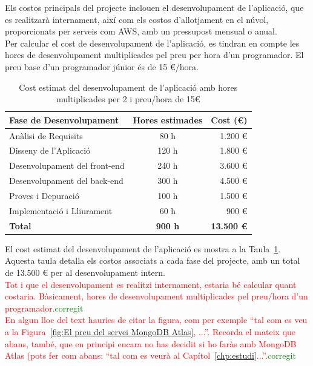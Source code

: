 \documentclass[a4paper,12pt,twoside]{ThesisStyle}
\newcommand{\pau}[1]{\textcolor{red}{#1}}
\newcommand{\sudan}[1]{\textcolor{green}{#1}}
\begin{document}
Els costos principals del projecte inclouen el desenvolupament de l'aplicació, que es realitzarà internament, així com els costos d'allotjament en el núvol, proporcionats per serveis com AWS, amb un pressupost mensual o anual.\\

Per calcular el cost de desenvolupament de l’aplicació, es tindran en compte les hores de desenvolupament multiplicades pel preu per hora d'un programador. El preu base d'un programador júnior és de 15 €/hora.

\begin{table}[h!]
    \centering
    \begin{tabular}{|l|c|r|}
    \hline
    \textbf{Fase de Desenvolupament} & \textbf{Hores estimades} & \textbf{Cost (€)} \\ \hline
    Anàlisi de Requisits       & 80 h  & 1.200 € \\ \hline
    Disseny de l'Aplicació     & 120 h  & 1.800 € \\ \hline
    Desenvolupament del front-end & 240 h & 3.600 € \\ \hline
    Desenvolupament del back-end  & 300 h & 4.500 € \\ \hline
    Proves i Depuració         & 100 h  & 1.500 € \\ \hline
    Implementació i Lliurament & 60 h  & 900 €  \\ \hline
    \textbf{Total}             & \textbf{900 h} & \textbf{13.500 €}  \\ \hline
    \end{tabular}
    \caption{Cost estimat del desenvolupament de l'aplicació amb hores multiplicades per 2 i preu/hora de 15€}
    \label{tab:costos_desenvolupament}
\end{table}



El cost estimat del desenvolupament de l'aplicació es mostra a la Taula~\ref{tab:costos_desenvolupament}. Aquesta taula detalla els costos associats a cada fase del projecte, amb un total de 13.500 € per al desenvolupament intern.\\


\pau{Tot i que el desenvolupament es realitzi internament, estaria bé calcular quant costaria. Bàsicament, hores de desenvolupament multiplicades pel preu/hora d'un programador.}\sudan{corregit}\\


\pau{En algun lloc del text hauries de citar la figura, com per exemple ``tal com es veu a la Figura~\ref{fig:El preu del servei MongoDB Atlas}, ...''. Recorda el mateix que abans, també, que en principi encara no has decidit si ho faràs amb MongoDB Atlas (pots fer com abans: ``tal com es veurà al Capítol~\ref{chp:estudi}...''.}\sudan{corregit}
\end{document}
